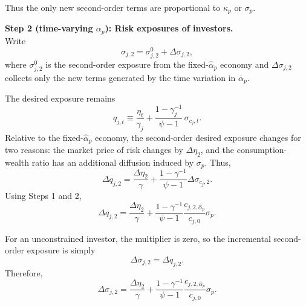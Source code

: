 Thus the only new second-order terms are proportional to $\kappa_p$ or $\sigma_p$.

\noindent\textbf{Step 2 (time-varying $\alpha_p$): Risk exposures of investors.}\\
Write
\begin{equation}
    \sigma_{j,2} = \sigma_{j,2}^{0} + \Delta\sigma_{j,2},
\end{equation}
where $\sigma_{j,2}^{0}$ is the second-order exposure from the fixed-$\hat{\alpha}_p$ economy and $\Delta\sigma_{j,2}$ collects only the new terms generated by the time variation in $\overline{\alpha}_p$.

The desired exposure remains
\begin{equation}
    q_{j,t}
    \equiv \frac{\eta_t}{\gamma_j}+\frac{1-\gamma_j^{-1}}{\psi-1}\,\sigma_{c_j,t}.
\end{equation}
Relative to the fixed-$\hat{\alpha}_p$ economy, the second-order desired exposure changes for two reasons: the market price of risk changes by $\Delta\eta_2$, and the consumption-wealth ratio has an additional diffusion induced by $\sigma_p$.
Thus,
\begin{equation}
    \Delta q_{j,2}
    =\frac{\Delta\eta_2}{\gamma}
    +\frac{1-\gamma^{-1}}{\psi-1}\Delta\sigma_{c_j,2}.
\end{equation}
Using Steps 1 and 2,
\begin{equation}
    \Delta q_{j,2}
    =\frac{\Delta\eta_2}{\gamma}
    +\frac{1-\gamma^{-1}}{\psi-1}\frac{c_{j,2,\hat{\alpha}_p}}{c_{j,0}}\sigma_p.
\end{equation}

For an unconstrained investor, the multiplier is zero, so the incremental second-order exposure is simply
\begin{equation}
    \Delta\sigma_{j,2}=\Delta q_{j,2}.
\end{equation}
Therefore,
\begin{equation}\label{eq:delta-sigma-j2-unconstrained-alpha-p}
    \Delta\sigma_{j,2}
    =\frac{\Delta\eta_2}{\gamma}
    +\frac{1-\gamma^{-1}}{\psi-1}\frac{c_{j,2,\hat{\alpha}_p}}{c_{j,0}}\sigma_p.
\end{equation}

